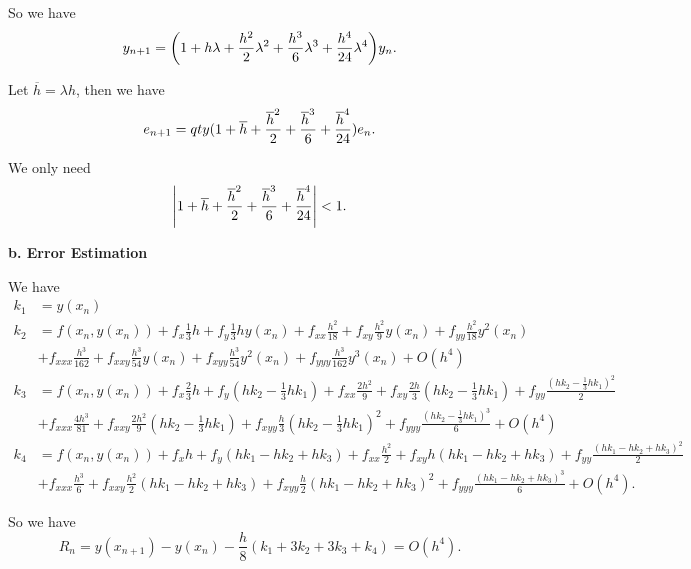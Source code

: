 \documentclass[a4paper]{article}
\begin{document}
So we have
\begin{equation}
    y_{n+1} = \qty(1 + h \lambda + \frac{h^2}{2} \lambda^2 + \frac{h^3}{6} \lambda^3 + \frac{h^4}{24} \lambda^4) y_n.
\end{equation}

Let $\overline{h} = \lambda h$, then we have 
\begin{equation}
    e_{n+1} = \\qty(1+ \overline{h} + \frac{\overline{h}^2}{2} + \frac{\overline{h}^3}{6} + \frac{\overline{h}^4}{24}) e_n.
\end{equation}

We only need
\begin{equation}
    \abs{1+ \overline{h} + \frac{\overline{h}^2}{2} + \frac{\overline{h}^3}{6} + \frac{\overline{h}^4}{24}} < 1.
\end{equation}


\textbf{b. Error Estimation}

We have 
\begin{equation}
    \begin{aligned}
        k_1 &= y(x_n) \\
        k_2 &= f(x_n, y(x_n)) + f_x \frac{1}{3}h + f_y \frac{1}{3} h y(x_n) + f_{xx} \frac{h^2}{18} + f_{xy} \frac{h^2}{9} y(x_n) + f_{yy} \frac{h^2}{18} y^2(x_n) \\ 
            &+ f_{xxx} \frac{h^3}{162} + f_{xxy} \frac{h^3}{54} y(x_n) + f_{xyy} \frac{h^3}{54} y^2(x_n) + f_{yyy} \frac{h^3}{162} y^3(x_n) + O(h^4) \\
        k_3 &= f(x_n, y(x_n)) + f_x \frac{2}{3}h + f_y (hk_2 - \frac{1}{3}hk_1) + f_{xx} \frac{2h^2}{9} + f_{xy}  \frac{2h}{3} (hk_2 - \frac{1}{3}hk_1) + f_{yy} \frac{(hk_2 - \frac{1}{3}hk_1)^2}{2} \\
        &+ f_{xxx} \frac{4h^3}{81} + f_{xxy} \frac{2h^2}{9} (hk_2 - \frac{1}{3}hk_1) + f_{xyy} \frac{h}{3} (hk_2 - \frac{1}{3}hk_1)^2 + f_{yyy} \frac{(hk_2 - \frac{1}{3}hk_1)^3}{6} + O(h^4) \\
        k_4 &= f(x_n, y(x_n)) + f_x h + f_y (hk_1 - hk_2+hk_3) + f_{xx} \frac{h^2}{2} + f_{xy} h (hk_1 - hk_2+hk_3) + f_{yy} \frac{(hk_1 - hk_2+hk_3)^2}{2} \\
        &+ f_{xxx} \frac{h^3}{6} + f_{xxy} \frac{h^2}{2} (hk_1 - hk_2+hk_3) + f_{xyy} \frac{h}{2} (hk_1 - hk_2+hk_3)^2 + f_{yyy} \frac{(hk_1 - hk_2+hk_3)^3}{6} + O(h^4).
    \end{aligned}
\end{equation}

So we have 
\begin{equation}
    R_n = y(x_{n+1}) - y(x_n) - \frac{h}{8} (k_1 + 3k_2 + 3k_3 + k_4) = O(h^4). 
\end{equation}
\end{document}
